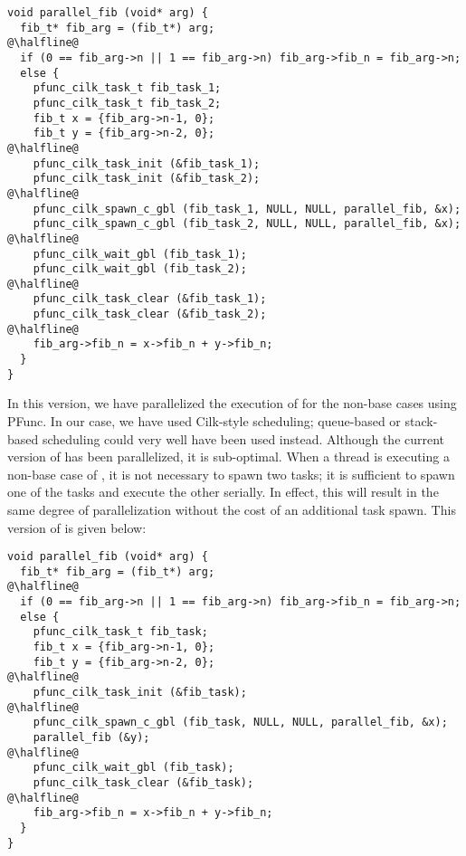 \begin{lstlisting}
void parallel_fib (void* arg) {
  fib_t* fib_arg = (fib_t*) arg;
@\halfline@
  if (0 == fib_arg->n || 1 == fib_arg->n) fib_arg->fib_n = fib_arg->n;
  else {
    pfunc_cilk_task_t fib_task_1;
    pfunc_cilk_task_t fib_task_2;
    fib_t x = {fib_arg->n-1, 0};
    fib_t y = {fib_arg->n-2, 0};
@\halfline@
    pfunc_cilk_task_init (&fib_task_1);
    pfunc_cilk_task_init (&fib_task_2);
@\halfline@
    pfunc_cilk_spawn_c_gbl (fib_task_1, NULL, NULL, parallel_fib, &x);
    pfunc_cilk_spawn_c_gbl (fib_task_2, NULL, NULL, parallel_fib, &x);
@\halfline@
    pfunc_cilk_wait_gbl (fib_task_1);
    pfunc_cilk_wait_gbl (fib_task_2);
@\halfline@
    pfunc_cilk_task_clear (&fib_task_1);
    pfunc_cilk_task_clear (&fib_task_2);
@\halfline@
    fib_arg->fib_n = x->fib_n + y->fib_n;
  }
}
\end{lstlisting}
%
In this version, we have parallelized the execution of  for
the non-base cases using PFunc. 
%
In our case, we have used Cilk-style scheduling; queue-based or stack-based
scheduling could very well have been used instead. 
%
Although the current version of  has been parallelized, it
is sub-optimal. 
%
When a thread is executing a non-base case of , it is not
necessary to spawn two tasks; it is sufficient to spawn one of the tasks and
execute the other serially. 
%
In effect, this will result in the same degree of parallelization
without the cost of an additional task spawn. 
%
This version of  is given below:
%
\begin{lstlisting}
void parallel_fib (void* arg) {
  fib_t* fib_arg = (fib_t*) arg;
@\halfline@
  if (0 == fib_arg->n || 1 == fib_arg->n) fib_arg->fib_n = fib_arg->n;
  else {
    pfunc_cilk_task_t fib_task;
    fib_t x = {fib_arg->n-1, 0};
    fib_t y = {fib_arg->n-2, 0};
@\halfline@
    pfunc_cilk_task_init (&fib_task);
@\halfline@
    pfunc_cilk_spawn_c_gbl (fib_task, NULL, NULL, parallel_fib, &x);
    parallel_fib (&y);
@\halfline@
    pfunc_cilk_wait_gbl (fib_task);
    pfunc_cilk_task_clear (&fib_task);
@\halfline@
    fib_arg->fib_n = x->fib_n + y->fib_n;
  }
}
\end{lstlisting}
 
